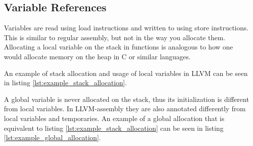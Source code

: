 






\subsection{Variable References}

Variables are read using load instructions and written to using store instructions. This is similar to regular assembly, but not in the way you allocate them.
Allocating a local variable on the stack in functions is analogous to how one would allocate memory on the heap in C or similar languages.

An example of stack allocation and usage of local variables in LLVM can be seen in listing \ref{lst:example_stack_allocation}.



A global variable is never allocated on the stack, thus its initialization is different from local variables. In LLVM-assembly they are also annotated differently from local variables and temporaries.
An example of a global allocation that is equivalent to listing \ref{lst:example_stack_allocation} can be seen in listing \ref{lst:example_global_allocation}.



